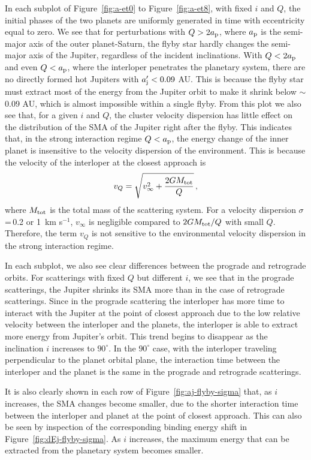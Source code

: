 \documentclass[twocolumn]{aastex63}
\newcommand*\fgr[1]{Figure~\ref{#1}}
\begin{document}
 In each subplot of \fgr{fig:a-et0} to \fgr{fig:a-et8}, with fixed $i$ and $Q$, the initial phases of the two planets are uniformly generated in time with eccentricity equal to zero. We see that for perturbations with $Q>2a_{\rm p}$, where $a_{\rm p}$ is the semi-major axis of the outer planet-Saturn, the flyby star hardly changes the semi-major axis of the Jupiter, regardless of the incident inclinations. With $Q<2a_{\rm p}$ and even $Q<a_{\rm p}$, where the interloper penetrates the planetary system, there are no directly formed hot Jupiters with $a_{\rm j}^\prime < 0.09$ AU. This is because the flyby star must extract most of the energy from the Jupiter orbit to make it shrink below $\sim$ 0.09 AU, which is almost impossible within a single flyby. From this plot we also see that, for a given $i$ and $Q$, the cluster velocity dispersion has little effect on the distribution of the SMA of the Jupiter right after the flyby. This indicates that,  in the strong interaction regime $Q<a_{\rm p}$, the energy change of the inner planet is insensitive to the velocity dispersion of the environment. This is because the velocity of the interloper at the closest approach is
\begin{equation}\label{eq:vq}
v_{Q} = \sqrt{v_\infty^2 + \frac{2GM_{\rm tot}}{Q}}\,,
\end{equation}
where $M_{\rm tot}$ is the total mass of the scattering system. For a velocity dispersion $\sigma$\,=\,0.2 or 1~km s$^{-1}$, $v_\infty$ is negligible compared to ${2GM_{\rm tot}}/{Q}$ with small $Q$. Therefore, the term $v_{Q}$ is not sensitive to the environmental velocity dispersion in the strong interaction regime.

In each subplot, we also see clear differences between the prograde and retrograde orbits. For scatterings with fixed $Q$ but different $i$, we see that in the prograde scatterings, the Jupiter shrinks its SMA more than in the case of retrograde scatterings. Since in the prograde scattering the interloper has more time to interact with the Jupiter at the point of closest approach due to the low relative velocity between the interloper and the planets, the interloper is able to extract more energy from Jupiter's orbit. This trend begins to disappear as the inclination $i$ increases to  $90^\circ$. In the $90^\circ$ case, with the interloper traveling perpendicular to the planet orbital plane, the interaction time between the interloper and the planet is the same in the prograde and retrograde scatterings.

It is also clearly shown in each row of  \fgr{fig:aj-flyby-sigma}
that, as  $i$ increases, the SMA changes become smaller, due to the shorter interaction time between the interloper and planet at the point of closest approach. This can also be seen by inspection of the corresponding binding energy shift in \fgr{fig:dEj-flyby-sigma}. As  $i$ increases, the maximum energy that can be extracted from the planetary system becomes smaller.
\end{document}
